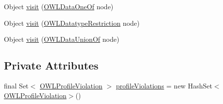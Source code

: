 \begin{DoxyCompactItemize}
\item 
Object \hyperlink{classorg_1_1semanticweb_1_1owlapi_1_1profiles_1_1_o_w_l2_q_l_profile_1_1_o_w_l2_q_l_object_visitor_a50c7a2cd6e911553272b07cbe5c50264}{visit} (\hyperlink{interfaceorg_1_1semanticweb_1_1owlapi_1_1model_1_1_o_w_l_data_one_of}{O\-W\-L\-Data\-One\-Of} node)
\item 
Object \hyperlink{classorg_1_1semanticweb_1_1owlapi_1_1profiles_1_1_o_w_l2_q_l_profile_1_1_o_w_l2_q_l_object_visitor_a14cea4915591824408f6dc108f26201e}{visit} (\hyperlink{interfaceorg_1_1semanticweb_1_1owlapi_1_1model_1_1_o_w_l_datatype_restriction}{O\-W\-L\-Datatype\-Restriction} node)
\item 
Object \hyperlink{classorg_1_1semanticweb_1_1owlapi_1_1profiles_1_1_o_w_l2_q_l_profile_1_1_o_w_l2_q_l_object_visitor_a5c71d0beba0509f7dc8a79b0e14275bd}{visit} (\hyperlink{interfaceorg_1_1semanticweb_1_1owlapi_1_1model_1_1_o_w_l_data_union_of}{O\-W\-L\-Data\-Union\-Of} node)
\end{DoxyCompactItemize}
\subsection*{Private Attributes}
\begin{DoxyCompactItemize}
\item 
final Set$<$ \hyperlink{classorg_1_1semanticweb_1_1owlapi_1_1profiles_1_1_o_w_l_profile_violation}{O\-W\-L\-Profile\-Violation} $>$ \hyperlink{classorg_1_1semanticweb_1_1owlapi_1_1profiles_1_1_o_w_l2_q_l_profile_1_1_o_w_l2_q_l_object_visitor_a69a5f073271112b4ee6a3ebc7f596d71}{profile\-Violations} = new Hash\-Set$<$\hyperlink{classorg_1_1semanticweb_1_1owlapi_1_1profiles_1_1_o_w_l_profile_violation}{O\-W\-L\-Profile\-Violation}$>$()
\end{DoxyCompactItemize}


